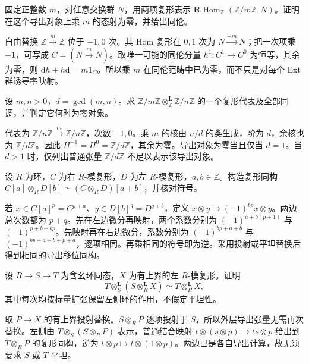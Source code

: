 \begin{exercise}\label{b4:ex:18-derived-annihilation}
	固定正整数 \(m\)，对任意交换群 \(N\)，用两项复形表示 \(\mathbf R\operatorname{Hom}_{\mathbb Z}(\mathbb Z/m\mathbb Z,N)\)。证明在这个导出对象上乘 \(m\) 的态射为零，并给出同伦。
\end{exercise}
\begin{solution}
	自由替换 \(\mathbb Z\xrightarrow{m}\mathbb Z\) 位于 \(-1,0\) 次。其 Hom 复形在 \(0,1\) 次为 \(N\xrightarrow{-m}N\)；把一次项乘 \(-1\)，可写成 \(C=(N\xrightarrow{m}N)\)。取唯一可能的同伦分量 \(h^1:C^1\to C^0\) 为恒等，其余为零，则 \(\mathrm{d}h+h\mathrm{d}=m1_C\)。所以乘 \(m\) 在同伦范畴中已为零，而不只是对每个 Ext 群诱导零映射。
\end{solution}

\begin{exercise}\label{b4:ex:18-integer-derived-tensor}
	设 \(m,n>0\)，\(d=\gcd(m,n)\)。求 \(\mathbb Z/m\mathbb Z\otimes_{\mathbb Z}^{\mathbf L}\mathbb Z/n\mathbb Z\) 的一个复形代表及全部同调，并判定它何时为零对象。
\end{exercise}
\begin{solution}
	代表为 \(\mathbb Z/n\mathbb Z\xrightarrow{m}\mathbb Z/n\mathbb Z\)，次数 \(-1,0\)。乘 \(m\) 的核由 \(n/d\) 的类生成，阶为 \(d\)，余核也为 \(\mathbb Z/d\mathbb Z\)。因此 \(H^{-1}=H^0=\mathbb Z/d\mathbb Z\)，其余为零。导出对象为零当且仅当 \(d=1\)。当 \(d>1\) 时，仅列出普通张量 \(\mathbb Z/d\mathbb Z\) 不足以表示该导出对象。
\end{solution}

\begin{exercise}\label{b4:ex:18-tensor-shift-sign}
	设 \(R\) 为环，\(C\) 为右 \(R\)-模复形，\(D\) 为左 \(R\)-模复形，\(a,b\in\mathbb Z\)。构造复形同构 \(C[a]\otimes_RD[b]\simeq(C\otimes_RD)[a+b]\)，并核对符号。
\end{exercise}
\begin{solution}
	若 \(x\in C[a]^p=C^{p+a}\)、\(y\in D[b]^q=D^{q+b}\)，定义 \(x\otimes y\mapsto(-1)^{bp}x\otimes y\)。两边总次数都为 \(p+q\)。先在左边微分再映射，两个系数分别为 \((-1)^{a+b(p+1)}\) 与 \((-1)^{p+b+bp}\)。先映射再在右边微分，系数分别为 \((-1)^{bp+a+b}\) 与 \((-1)^{bp+a+b+p+a}\)，逐项相同。再乘相同的符号即为逆。采用投射或平坦替换后得到相同的导出移位同构。
\end{solution}

\begin{exercise}\label{b4:ex:18-extension-tower}
	设 \(R\to S\to T\) 为含幺环同态，\(X\) 为有上界的左 \(R\)-模复形。证明
	\[
		T\otimes_S^{\mathbf L}(S\otimes_R^{\mathbf L}X) \simeq T\otimes_R^{\mathbf L}X,
	\]
	其中每次均按标量扩张保留左侧环的作用，不假定平坦性。
\end{exercise}
\begin{solution}
	取 \(P\to X\) 的有上界投射替换。\(S\otimes_RP\) 逐项投射于 \(S\)，所以外层导出张量无需再次替换。左侧由 \(T\otimes_S(S\otimes_RP)\) 表示，普通结合映射 \(t\otimes(s\otimes p)\mapsto ts\otimes p\) 给出到 \(T\otimes_RP\) 的复形同构，逆为 \(t\otimes p\mapsto t\otimes(1\otimes p)\)。两边已是各自导出计算，故无须要求 \(S\) 或 \(T\) 平坦。
\end{solution}

